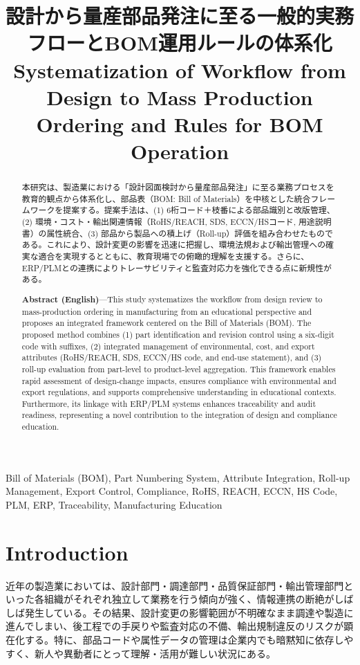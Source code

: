 \documentclass[10pt,conference]{IEEEtran}
\title{%
設計から量産部品発注に至る一般的実務フローとBOM運用ルールの体系化\\
\large Systematization of Workflow from Design to Mass Production Ordering and Rules for BOM Operation
}
\author{%
  \IEEEauthorblockN{三溝 真一 (Shinichi Samizo)}%
  \IEEEauthorblockA{独立系半導体研究者（元セイコーエプソン） / Independent Semiconductor Researcher (ex-Seiko Epson)\\%
  Email: \href{mailto:shin3t72@gmail.com}{shin3t72@gmail.com}\quad
  GitHub: \url{https://github.com/Samizo-AITL}}%
}
\begin{document}
\maketitle

\begin{abstract}
本研究は、製造業における「設計図面検討から量産部品発注」に至る業務プロセスを教育的観点から体系化し、部品表（BOM: Bill of Materials）を中核とした統合フレームワークを提案する。提案手法は、(1) 6桁コード＋枝番による部品識別と改版管理、(2) 環境・コスト・輸出関連情報（RoHS/REACH, SDS, ECCN/HSコード, 用途説明書）の属性統合、(3) 部品から製品への積上げ（Roll-up）評価を組み合わせたものである。これにより、設計変更の影響を迅速に把握し、環境法規および輸出管理への確実な適合を実現するとともに、教育現場での俯瞰的理解を支援する。さらに、ERP/PLMとの連携によりトレーサビリティと監査対応力を強化できる点に新規性がある。

\textbf{Abstract (English)}—This study systematizes the workflow from design review to mass-production ordering in manufacturing from an educational perspective and proposes an integrated framework centered on the Bill of Materials (BOM). The proposed method combines (1) part identification and revision control using a six-digit code with suffixes, (2) integrated management of environmental, cost, and export attributes (RoHS/REACH, SDS, ECCN/HS code, and end-use statement), and (3) roll-up evaluation from part-level to product-level aggregation. This framework enables rapid assessment of design-change impacts, ensures compliance with environmental and export regulations, and supports comprehensive understanding in educational contexts. Furthermore, its linkage with ERP/PLM systems enhances traceability and audit readiness, representing a novel contribution to the integration of design and compliance education.
\end{abstract}

\begin{IEEEkeywords}
Bill of Materials (BOM), Part Numbering System, Attribute Integration, Roll-up Management, Export Control, Compliance, RoHS, REACH, ECCN, HS Code, PLM, ERP, Traceability, Manufacturing Education
\end{IEEEkeywords}

\section{Introduction}
近年の製造業においては、設計部門・調達部門・品質保証部門・輸出管理部門といった各組織がそれぞれ独立して業務を行う傾向が強く、情報連携の断絶がしばしば発生している。その結果、設計変更の影響範囲が不明確なまま調達や製造に進んでしまい、後工程での手戻りや監査対応の不備、輸出規制違反のリスクが顕在化する。特に、部品コードや属性データの管理は企業内でも暗黙知に依存しやすく、新人や異動者にとって理解・活用が難しい状況にある。
\end{document}
